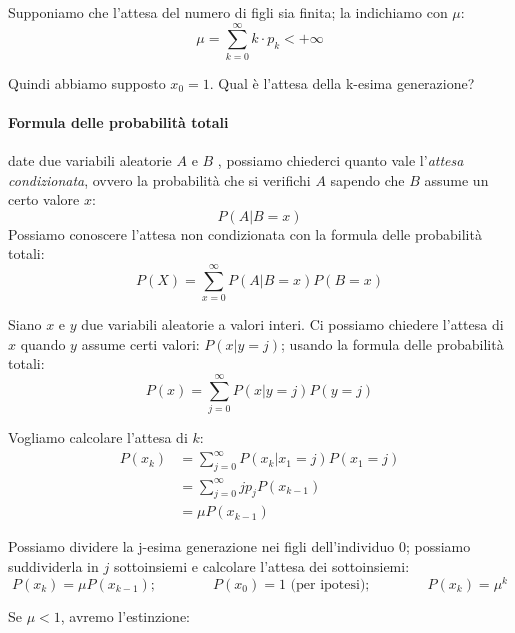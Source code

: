\documentclass[a4paper,12pt]{book}
\begin{document}
Supponiamo che l'attesa del numero di figli sia finita; la indichiamo con $ \mu $:
$$ \mu = \sum_{k=0}^{\infty} k \cdot p_k < +\infty $$

Quindi abbiamo supposto $ x_0 = 1 $. Qual è l'attesa della k-esima generazione?

\begin{tcolorbox}
	\paragraph{Formula delle probabilità totali} date due variabili aleatorie $ A $ e $ B $ , possiamo chiederci quanto vale l'\textit{attesa condizionata}, ovvero la probabilità che si verifichi $ A $ sapendo che $ B $ assume un certo valore $ x $:
		$$ P(A | B = x) $$
	Possiamo conoscere l'attesa non condizionata con la formula delle probabilità totali:
		$$ P(X) = \sum_{x=0}^{\infty} P(A|B=x)P(B=x) $$
\end{tcolorbox}

Siano $ x $ e $ y $ due variabili aleatorie a valori interi. Ci possiamo chiedere l'attesa di $ x $ quando $ y $ assume certi valori: $ P(x | y = j) $; usando la formula delle probabilità totali: 
$$ P(x) = \sum_{j=0}^{\infty} P(x | y = j)P(y=j) $$

Vogliamo calcolare l'attesa di $ k $:
\begin{align*}
	P(x_k) & = \sum_{j=0}^{\infty} P(x_k | x_1 = j)P(x_1 = j) \\
	& = \sum_{j=0}^{\infty} jp_jP(x_{k-1}) \\
	& = \mu P(x_{k-1})
\end{align*}

Possiamo dividere la j-esima generazione nei figli dell'individuo 0; %
possiamo suddividerla in $ j $ sottoinsiemi e calcolare l'attesa dei sottoinsiemi:
$$ P(x_k) = \mu P(x_{k-1}); \qquad \qquad P(x_0) = 1 \text{ (per ipotesi)}; \qquad \qquad P(x_k)=\mu^k$$

Se $\mu < 1$, avremo l'estinzione:
\end{document}
